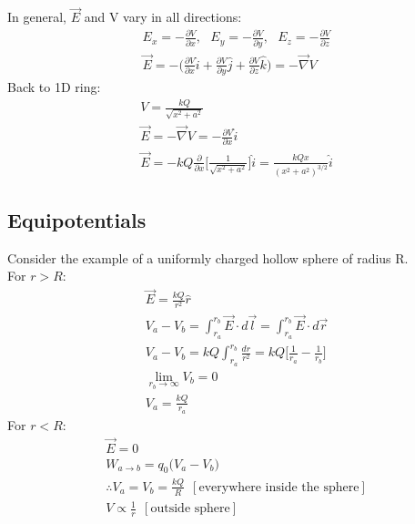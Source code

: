\documentclass[a4paper, 11pt, fleqn, normalem]{report}
\begin{document}
In general, $\vec{E}$ and V vary in all directions:
\begin{gather*}
    E_{x} = - \frac{\partial V}{\partial x}, ~~~ E_{y} = - \frac{\partial V}{\partial y}, ~~~ E_{z} = - \frac{\partial V}{\partial z} \\
    \vec{E} = - \Bigg(\frac{\partial V}{\partial x} \hat{i} + \frac{\partial V}{\partial y} \hat{j} + \frac{\partial V}{\partial z} \hat{k} \Bigg) = - \vec{\nabla} V
\end{gather*}
Back to 1D ring:
\begin{gather*}
    V = \frac{kQ}{\sqrt{x^{2} + a^{2}}} \\
    \vec{E} = -\vec{\nabla}V = - \frac{\partial V}{\partial x} \hat{i} \\
    \vec{E} = -kQ \frac{\partial}{\partial x} \Bigg[\frac{1}{\sqrt{x^{2} + a^{2}}} \Bigg] \hat{i} = \frac{kQx}{(x^{2} + a^{2})^{3/2}} \hat{i}
\end{gather*}

\section{Equipotentials}
Consider the example of a uniformly charged hollow sphere of radius R. \\
For $r > R$:
\begin{gather*}
    \vec{E} = \frac{kQ}{r^{2}} \hat{r} \\
    V_{a} - V_{b} = \int_{r_{a}}^{r_{b}} \vec{E} \cdot d\vec{l} = \int_{r_{a}}^{r_{b}} \vec{E} \cdot d\vec{r} \\
    V_{a} - V_{b} = kQ \int_{r_{a}}^{r_{b}} \frac{dr}{r^{2}} = kQ \Big[ \frac{1}{r_{a}} - \frac{1}{r_{b}} \Big] \\
    \lim_{r_{b} \to \infty} V_{b} = 0 \\
    V_{a} = \frac{kQ}{r_{a}}
\end{gather*}
For $r < R$:
\begin{gather*}
    \vec{E} = 0 \\
    W_{a \to b}= q_{0}\big(V_{a} - V_{b} \big) \\
    \therefore V_{a} = V_{b} = \frac{kQ}{R} ~~[\text{everywhere inside the sphere}] \\
    V \propto \frac{1}{r} ~~[\text{outside sphere}]
\end{gather*}

\chapter{}
\end{document}
